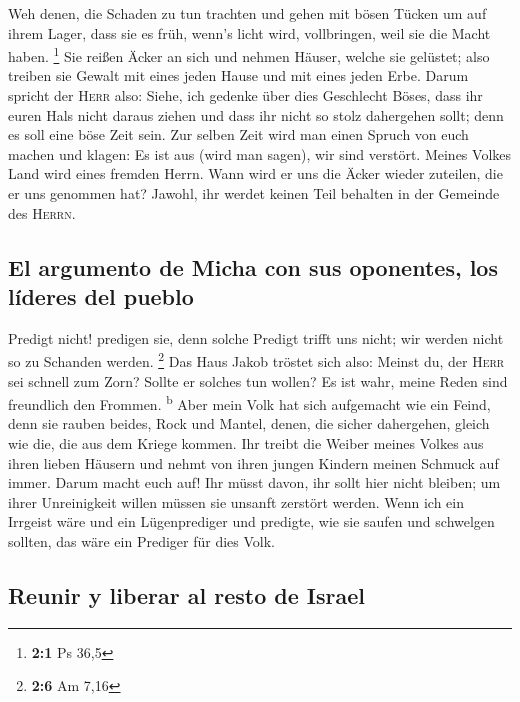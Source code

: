  Weh denen, die Schaden zu tun trachten und gehen mit
bösen Tücken um auf ihrem Lager, dass sie es früh, wenn's licht wird,
vollbringen, weil sie die Macht haben. \footnote{\textbf{2:1} Ps 36,5}
 Sie reißen Äcker an sich und nehmen Häuser, welche sie
gelüstet; also treiben sie Gewalt mit eines jeden Hause und mit eines
jeden Erbe.  Darum spricht der \textsc{Herr} also: Siehe,
ich gedenke über dies Geschlecht Böses, dass ihr euren Hals nicht daraus
ziehen und dass ihr nicht so stolz dahergehen sollt; denn es soll eine
böse Zeit sein.  Zur selben Zeit wird man einen Spruch von
euch machen und klagen: Es ist aus (wird man sagen), wir sind verstört.
Meines Volkes Land wird eines fremden Herrn. Wann wird er uns die Äcker
wieder zuteilen, die er uns genommen hat?  Jawohl, ihr
werdet keinen Teil behalten in der Gemeinde des \textsc{Herrn}.

\hypertarget{el-argumento-de-micha-con-sus-oponentes-los-luxedderes-del-pueblo}{%
\subsection{El argumento de Micha con sus oponentes, los líderes del
pueblo}\label{el-argumento-de-micha-con-sus-oponentes-los-luxedderes-del-pueblo}}

 Predigt nicht! predigen sie, denn solche Predigt trifft
uns nicht; wir werden nicht so zu Schanden werden. \footnote{\textbf{2:6}
  Am 7,16}  Das Haus Jakob tröstet sich also: Meinst du,
der \textsc{Herr} sei schnell zum Zorn? Sollte er solches tun wollen? Es
ist wahr, meine Reden sind freundlich den Frommen. \textsuperscript{b}
 Aber mein Volk hat sich aufgemacht wie ein Feind, denn
sie rauben beides, Rock und Mantel, denen, die sicher dahergehen, gleich
wie die, die aus dem Kriege kommen.  Ihr treibt die Weiber
meines Volkes aus ihren lieben Häusern und nehmt von ihren jungen
Kindern meinen Schmuck auf immer.  Darum macht euch auf!
Ihr müsst davon, ihr sollt hier nicht bleiben; um ihrer Unreinigkeit
willen müssen sie unsanft zerstört werden.  Wenn ich ein
Irrgeist wäre und ein Lügenprediger und predigte, wie sie saufen und
schwelgen sollten, das wäre ein Prediger für dies Volk.

\hypertarget{reunir-y-liberar-al-resto-de-israel}{%
\subsection{Reunir y liberar al resto de
Israel}\label{reunir-y-liberar-al-resto-de-israel}}

